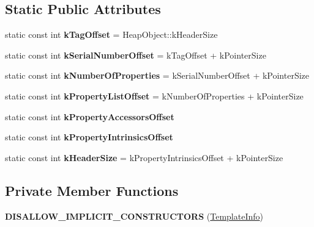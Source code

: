 \subsection*{Static Public Attributes}
\begin{DoxyCompactItemize}
\item 
static const int {\bfseries k\+Tag\+Offset} = Heap\+Object\+::k\+Header\+Size\hypertarget{classv8_1_1internal_1_1_template_info_a707d7c2573422152cb616cfcd5e615c5}{}\label{classv8_1_1internal_1_1_template_info_a707d7c2573422152cb616cfcd5e615c5}

\item 
static const int {\bfseries k\+Serial\+Number\+Offset} = k\+Tag\+Offset + k\+Pointer\+Size\hypertarget{classv8_1_1internal_1_1_template_info_ad6a39e24e71057914deb3c5f9255dc6c}{}\label{classv8_1_1internal_1_1_template_info_ad6a39e24e71057914deb3c5f9255dc6c}

\item 
static const int {\bfseries k\+Number\+Of\+Properties} = k\+Serial\+Number\+Offset + k\+Pointer\+Size\hypertarget{classv8_1_1internal_1_1_template_info_aed6acb2752927f89c0d5e1d98a2a01e1}{}\label{classv8_1_1internal_1_1_template_info_aed6acb2752927f89c0d5e1d98a2a01e1}

\item 
static const int {\bfseries k\+Property\+List\+Offset} = k\+Number\+Of\+Properties + k\+Pointer\+Size\hypertarget{classv8_1_1internal_1_1_template_info_aa81d841263b8c40644c86dbaccccf6b1}{}\label{classv8_1_1internal_1_1_template_info_aa81d841263b8c40644c86dbaccccf6b1}

\item 
static const int {\bfseries k\+Property\+Accessors\+Offset}
\item 
static const int {\bfseries k\+Property\+Intrinsics\+Offset}
\item 
static const int {\bfseries k\+Header\+Size} = k\+Property\+Intrinsics\+Offset + k\+Pointer\+Size\hypertarget{classv8_1_1internal_1_1_template_info_adab3309b0eba2ec032212844897b3c00}{}\label{classv8_1_1internal_1_1_template_info_adab3309b0eba2ec032212844897b3c00}

\end{DoxyCompactItemize}
\subsection*{Private Member Functions}
\begin{DoxyCompactItemize}
\item 
{\bfseries D\+I\+S\+A\+L\+L\+O\+W\+\_\+\+I\+M\+P\+L\+I\+C\+I\+T\+\_\+\+C\+O\+N\+S\+T\+R\+U\+C\+T\+O\+RS} (\hyperlink{classv8_1_1internal_1_1_template_info}{Template\+Info})\hypertarget{classv8_1_1internal_1_1_template_info_afd2af5f73b38fa4b0833f81bbdba81ca}{}\label{classv8_1_1internal_1_1_template_info_afd2af5f73b38fa4b0833f81bbdba81ca}

\end{DoxyCompactItemize}
